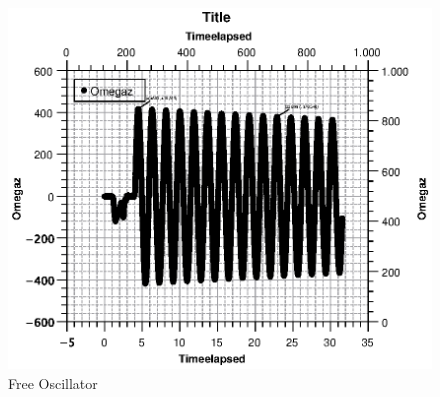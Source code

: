 \documentclass{scrartcl}
\begin{document}
\begin{figure}
    \centering
    \includegraphics[width=12cm]{Graph3.eps}
    \caption{Free Oscillator}
    \label{fig:}
\end{figure}
\end{document}
